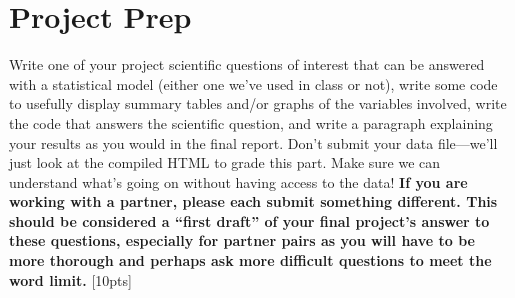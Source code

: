 \documentclass[12pt]{article}
\begin{document}
\section{Project Prep}

Write one of your project scientific questions of interest that can be answered with a statistical model (either one we've used in class or not), write some code to usefully display summary tables and/or graphs of the variables involved, write the code that answers the scientific question, and write a paragraph explaining your results as you would in the final report. Don't submit your data file---we'll just look at the compiled HTML to grade this part. Make sure we can understand what's going on without having access to the data! \textbf{If you are working with a partner, please each submit something different. This should be considered a ``first draft'' of your final project's answer to these questions, especially for partner pairs as you will have to be more thorough and perhaps ask more difficult questions to meet the word limit.} [10pts]
\end{document}
